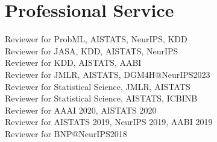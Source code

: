 \section*{Professional Service}
	 Reviewer for ProbML, AISTATS, NeurIPS, KDD\\
	 Reviewer for JASA, KDD, AISTATS, NeurIPS\\
	 Reviewer for KDD, AISTATS, AABI\\
	 Reviewer for JMLR, AISTATS, DGM4H@NeurIPS2023\\
	 Reviewer for Statistical Science, JMLR, AISTATS\\
	 Reviewer for Statistical Science, AISTATS, ICBINB \\
	 Reviewer for AAAI 2020, AISTATS 2020 \\
	 Reviewer for AISTATS 2019, NeurIPS 2019, AABI 2019 \\
	  Reviewer for BNP@NeurIPS2018 \\
